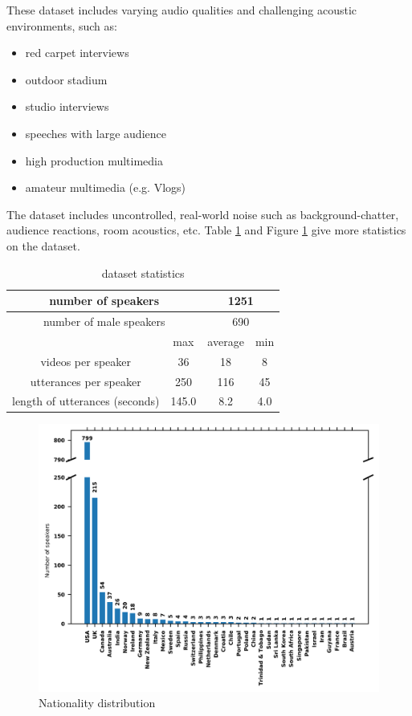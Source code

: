 \documentclass{article}
\begin{document}
These dataset includes varying audio qualities and challenging acoustic environments, such as:
\begin{itemize}
    \item red carpet interviews
    \item outdoor stadium
    \item studio interviews
    \item speeches with large audience
    \item high production multimedia
    \item amateur multimedia (e.g. Vlogs)
\end{itemize}

The dataset includes uncontrolled, real-world noise such as  background-chatter, audience reactions, room acoustics, etc. Table \ref{tab:stats_1} and Figure \ref{fig:stats_2} give more statistics on the dataset.


\begin{table}
    \centering
    \begin{tabular}{ |c||c|c|c|  }
    \hline
    \multicolumn{2}{|c|}{number of speakers} & \multicolumn{2}{|c|}{1251} \\
    \hline
    \multicolumn{2}{|c|}{number of male speakers} & \multicolumn{2}{|c|}{690} \\
    \hline
     & max & average & min \\
     \hline
    videos per speaker & 36 & 18 & 8 \\
    \hline
    utterances per speaker & 250 & 116 & 45 \\
    \hline
    length of utterances (seconds) & 145.0 & 8.2 & 4.0 \\
    \hline
    \end{tabular}
    \caption{dataset statistics}
    \label{tab:stats_1}
\end{table}
\begin{figure}
    \centering
    \includegraphics[scale=.75]{images/country.png}
    \caption{Nationality distribution}
    \label{fig:stats_2}
\end{figure}
\end{document}
